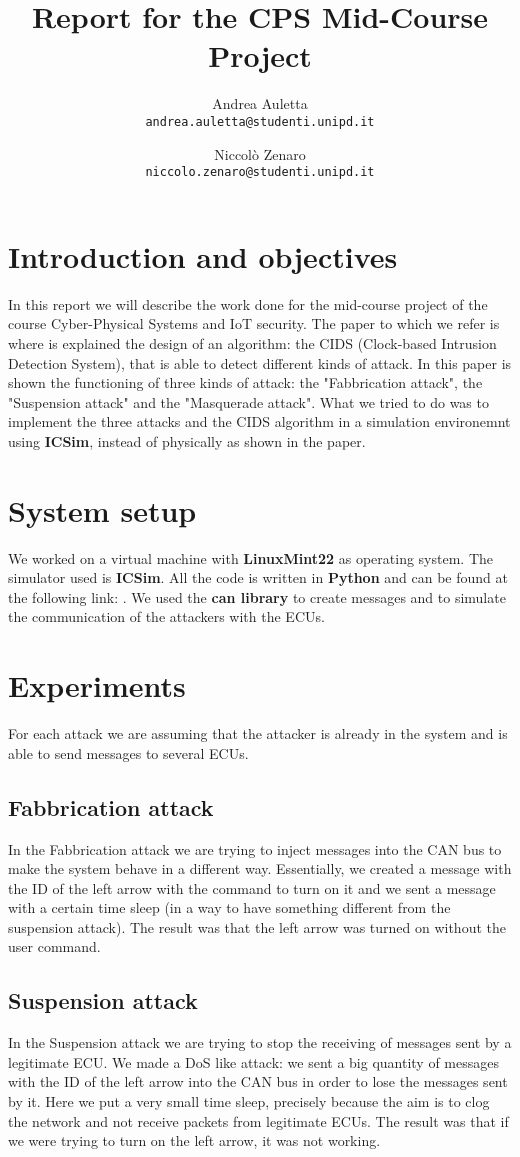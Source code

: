 \documentclass[12pt]{article}
\title{Report for the CPS Mid-Course Project}
\author{
    Andrea Auletta \\ \texttt{andrea.auletta@studenti.unipd.it} \and
    Niccolò Zenaro \\ \texttt{niccolo.zenaro@studenti.unipd.it}
}
\begin{document}
\maketitle
\newpage
\tableofcontents
\newpage

\section{Introduction and objectives}
In this report we will describe the work done for the mid-course project of the course Cyber-Physical Systems and IoT security. 
The paper to which we refer is \textbf{\cite{Cho2016} } where is explained the design of an algorithm: the CIDS (Clock-based Intrusion Detection System), that is able to detect different kinds of attack. In this paper is shown the functioning of three kinds of attack: the "Fabbrication attack", the "Suspension attack" and the "Masquerade attack". What we tried to do was to implement the three attacks and the CIDS algorithm in a simulation environemnt using \textbf{ICSim}, instead of physically as shown in the paper.
\section{System setup}
We worked on a virtual machine with \textbf{LinuxMint22} as operating system.
The simulator used is \textbf{ICSim}. All the code is written in \textbf{Python} and can be found at the following link: .%
We used the \textbf{can library} to create messages and to simulate the communication of the attackers with the ECUs.
\section{Experiments}
For each attack we are assuming that the attacker is already in the system and is able to send messages to several ECUs.
\subsection{Fabbrication attack}
In the Fabbrication attack we are trying to inject messages into the CAN bus to make the system behave in a different way. Essentially, we created a message with the ID of the left arrow with the command to turn on it and we sent a message with a certain time sleep (in a way to have something different from the suspension attack). The result was that the left arrow was turned on without the user command.
\subsection{Suspension attack}
In the Suspension attack we are trying to stop the receiving of messages sent by a legitimate ECU. We made a DoS like attack: we sent a big quantity of messages with the ID of the left arrow into the CAN bus in order to lose the messages sent by it. Here we put a very small time sleep, precisely because the aim is to clog the network and not receive packets from legitimate ECUs. The result was that if we were trying to turn on the left arrow, it was not working.
\end{document}
